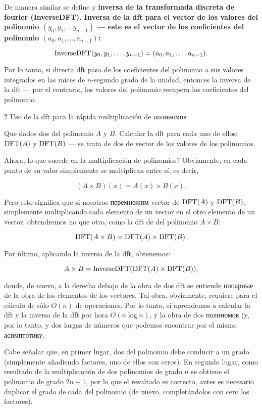 De manera similar se define y \bf{inversa de la transformada discreta de fourier} (InverseDFT). Inversa de la dft para el vector de los valores del polinomio $(y_0, y_1, \ldots y_{n-1})$ --- este es el vector de los coeficientes del polinomio $(a_0, a_1, \ldots, a_{n-1})$:

$$ {\rm InverseDFT}(y_0, y_1, \ldots, y_{n-1}) = (a_0, a_1, \ldots, a_{n-1}). $$

Por lo tanto, si directa dft pasa de los coeficientes del polinomio a sus valores integrados en las raíces de $n$-segundo grado de la unidad, entonces la inversa de la dft --- por el contrario, los valores del polinomio recupera los coeficientes del polinomio.


\h2{ Uso de la dft para la rápida multiplicación de полиномов }

Que dados dos del polinomio $A$ y $B$. Calcular la dft para cada uno de ellos: ${\rm DFT}(A)$ y ${\rm DFT}(B)$ --- se trata de dos de vector de los valores de los polinomios.

Ahora, lo que sucede en la multiplicación de polinomios? Obviamente, en cada punto de su valor simplemente se multiplican entre sí, es decir,

$$ (A \times B)(x) = A(x) \times B(x). $$

Pero esto significa que si nosotros перемножим vector de ${\rm DFT}(A)$ y ${\rm DFT}(B)$, simplemente multiplicando cada elemento de un vector en el otro elemento de un vector, obtendremos no que otro, como la dft de del polinomio $A \times B$:

$$ {\rm DFT} (A \times B) = {\rm DFT} (A) \times {\rm DFT} (B). $$

Por último, aplicando la inversa de la dft, obtenemos:

$$ A \times B = {\rm InverseDFT}( {\rm DFT} (A) \times {\rm DFT} (B) ), $$

donde, de nuevo, a la derecha debajo de la obra de dos dft se entiende попарные de la obra de los elementos de los vectores. Tal obra, obviamente, requiere para el cálculo de sólo $O(n)$ de operaciones. Por lo tanto, si aprendemos a calcular la dft y la inversa de la dft por hora $O(n \log n)$, y la obra de dos полиномов (y, por lo tanto, y dos largas de números que podemos encontrar por el mismo асимптотику.

Cabe señalar que, en primer lugar, dos del polinomio debe conducir a un grado (simplemente añadiendo factores, uno de ellos con ceros). En segundo lugar, como resultado de la multiplicación de dos polinomios de grado $n$ se obtiene el polinomio de grado $2n-1$, por lo que el resultado es correcto, antes es necesario duplicar el grado de cada del polinomio (de nuevo, completándolos con cero los factores).


